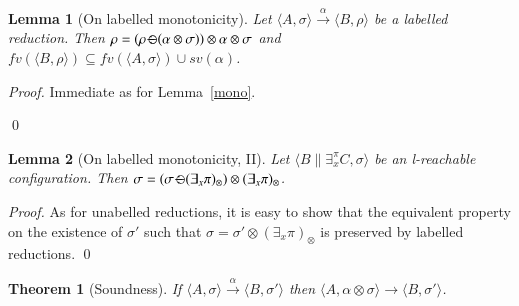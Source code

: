 \documentclass[preprint,12pt]{elsarticle}
\newtheorem{lemma}{Lemma}
\newtheorem{proof}{Proof}
\newtheorem{theorem}{Theorem}
\newcommand{\comment}[1]{}
\def\monid{{\mathbf 0}}
\def\odiv{\, {\ominus\hspace{-7.7pt} \div} \,}
\def\monid{\mathbf{1}}
\begin{document}
	
	\setcounter{lemma}{9}
	\begin{lemma}[On labelled monotonicity]
		\label{l-mono}
		Let $\langle A, \sigma \rangle \xrightarrow{\alpha} \langle B, \rho \rangle$ be a labelled reduction. 
		Then 
		$\rho = (\rho \odiv (\alpha \otimes \sigma)) \otimes \alpha \otimes \sigma$ and 
		$fv(\langle B, \rho \rangle) \subseteq fv(\langle A, \sigma \rangle) \cup sv(\alpha)$.
	\end{lemma}
	\begin {proof}
	Immediate as for Lemma~\ref{mono}.
	\comment{
		The first part is immediate as for Lemma~\ref{mono}.
		For the latter part, note that $\alpha \neq 1$ means that the proof of the reduction 
		uses only the axiom {\bf LA2}, and the property holds because 
		$\mathbb S$ is localised and $\rho = \alpha \otimes \sigma$.
		Let us check that the property 
		holds for {\bf LR2}. Inductively, we know that 
		$(\sigma_1 \odiv (\alpha \otimes \pi_0 \otimes \sigma)) = \monid$, and
		$(\alpha \otimes \sigma \otimes \exists_x ( \sigma_1 \odiv (\alpha \otimes \pi_0  \otimes \sigma))) \odiv (\alpha \otimes \sigma) = \monid$
		immediately follows.
	}
	\qed
\end{proof}

\setcounter{lemma}{10}
\begin{lemma}[On labelled monotonicity, II]
	\label{l-mono2}
	Let 
	$\langle B \parallel \exists_x^\pi C, \sigma \rangle$ 
	be an l-reachable configuration. 
	Then 
	$\sigma = (\sigma \odiv (\exists_x \pi)_\otimes) \otimes (\exists_x \pi)_\otimes$.
\end{lemma}
\begin{proof}
	As for unabelled reductions, it is easy to show that the equivalent property
	on the existence of $\sigma'$ such that 
	$\sigma = \sigma' \otimes (\exists_x \pi)_\otimes$ is preserved by 
	labelled reductions. 
	\qed
\end{proof}

\setcounter{theorem}{0}
\begin{theorem}[Soundness]
	\label{sound}
	If $\langle A, \sigma \rangle \xrightarrow{\alpha} \langle B, \sigma' \rangle$
	then %
	$\langle A, \alpha \otimes \sigma \rangle \to \langle B, \sigma' \rangle$.
\end{theorem}
\end{document}

